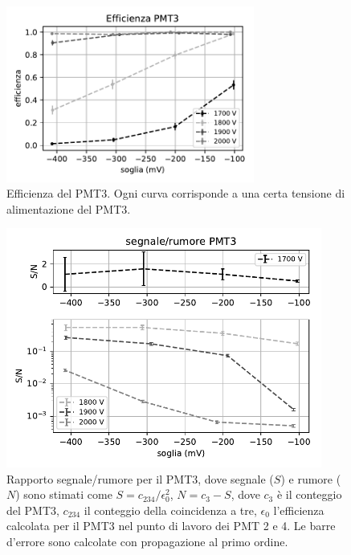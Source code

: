 \documentclass[a4paper]{article}
\begin{document}
\begin{figure}
	\centering
	\includegraphics[width=22em]{efficienza}
	\caption{\label{eff}%
	Efficienza del PMT3.
	Ogni curva corrisponde a una certa tensione di alimentazione del PMT3.}
\end{figure}

\begin{figure}
	\centering
	\includegraphics[width=28em]{SN3}
	\caption{%
	\label{fig:sn3}%
	Rapporto segnale/rumore per il PMT3,
	dove segnale ($S$) e rumore ($N$) sono stimati come
	$S=c_{234}/\epsilon_0^2$,
	$N=c_3 - S$,
	dove $c_3$ è il conteggio del PMT3,
	$c_{234}$ il conteggio della coincidenza a tre,
	$\epsilon_0$ l'efficienza calcolata per il PMT3 nel punto di lavoro dei PMT 2 e 4.
	Le barre d'errore sono calcolate con propagazione al primo ordine.}
\end{figure}
\end{document}
